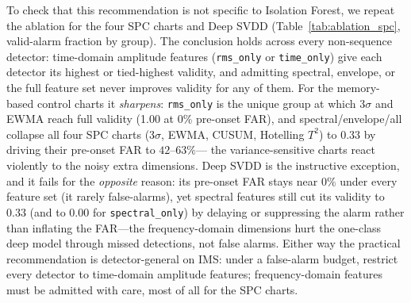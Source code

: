 \documentclass[journal]{IEEEtran}
\begin{document}
To check that this recommendation is not specific to Isolation Forest, we repeat
the ablation for the four SPC charts and Deep SVDD (Table~\ref{tab:ablation_spc},
valid-alarm fraction by group). The conclusion holds across every non-sequence
detector: time-domain amplitude features (\texttt{rms\_only} or \texttt{time\_only})
give each detector its highest or tied-highest validity, and admitting spectral,
envelope, or the full feature set never improves validity for any of them. For the
memory-based control charts it \emph{sharpens}: \texttt{rms\_only} is the unique
group at which 3$\sigma$ and EWMA reach full validity (1.00 at $0\%$ pre-onset
FAR), and spectral/envelope/all collapse all four SPC charts (3$\sigma$, EWMA,
CUSUM, Hotelling $T^2$) to $0.33$ by driving their pre-onset FAR to $42$--$63\%$---
the variance-sensitive charts react violently to the noisy extra dimensions. Deep
SVDD is the instructive exception, and it fails for the \emph{opposite} reason:
its pre-onset FAR stays near $0\%$ under every feature set (it rarely
false-alarms), yet spectral features still cut its validity to $0.33$ (and to
$0.00$ for \texttt{spectral\_only}) by delaying or suppressing the alarm rather
than inflating the FAR---the frequency-domain dimensions hurt the one-class deep
model through missed detections, not false alarms. Either way the practical
recommendation is detector-general on IMS: under a false-alarm budget, restrict
every detector to time-domain amplitude features; frequency-domain features must
be admitted with care, most of all for the SPC charts.
\end{document}
